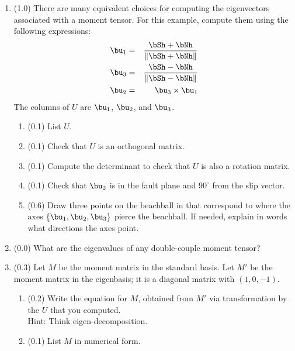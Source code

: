 \documentclass[11pt,titlepage,fleqn]{article}
\newcommand{\Umat}{U}
\newcommand{\Mmat}{M}
\begin{document}
\begin{enumerate}
\begin{enumerate}
\end{enumerate}


\item (1.0) There are many equivalent choices for computing the eigenvectors associated with a moment tensor. For this example, compute them using the following expressions:
%
\begin{eqnarray*}
\bu_1 &=& \frac{\bSh + \bNh}{\| \bSh + \bNh \|}
\\
\bu_3 &=& \frac{\bSh - \bNh}{\| \bSh - \bNh \|}
\\
\bu_2 &=& \bu_3  \times \bu_1
\end{eqnarray*}
%
The columns of $\Umat$ are $\bu_1$, $\bu_2$, and $\bu_3$.
%
\begin{enumerate}
\item (0.1) List $\Umat$.
\item (0.1) Check that $\Umat$ is an orthogonal matrix.
\item (0.1) Compute the determinant to check that $\Umat$ is also a rotation matrix.
\item (0.1) Check that $\bu_2$ is in the fault plane and $90^\circ$ from the slip vector.
\item (0.6) Draw three points on the beachball in  that correspond to where the axes $\{\bu_1,\bu_2,\bu_3\}$ pierce the beachball. If needed, explain in words what directions the axes point.
\end{enumerate}


\item (0.0) What are the eigenvalues of any double-couple moment tensor?


\item (0.3) Let $M$ be the moment matrix in the standard basis.
Let $M'$ be the moment matrix in the eigenbasis; it is a diagonal matrix with $(1, 0, -1)$.
%
\begin{enumerate}
\item (0.2) Write the equation for $\Mmat$, obtained from $\Mmat'$ via transformation by the $\Umat$ that you computed. \\
Hint: Think eigen-decomposition.
\item (0.1) List $\Mmat$ in numerical form.
\end{enumerate}

\end{enumerate}
\end{document}
